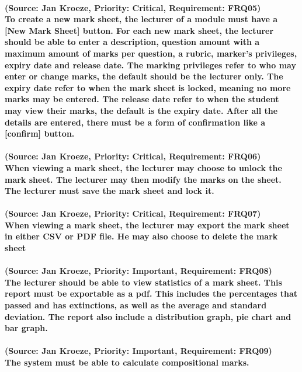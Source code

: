 \documentclass[12pt]{article}
\begin{document}
  \paragraph{(Source: Jan Kroeze, Priority: Critical, Requirement: FRQ05) \\
  To create a new mark sheet, the lecturer of a module must have a [New Mark Sheet] button. For each new mark sheet, the lecturer should be able to enter a description, question amount with a maximum amount of marks per question, a rubric, marker's privileges, expiry date and release date. The marking privileges refer to who may enter or change marks, the default should be the lecturer only. The expiry date refer to when the mark sheet is locked, meaning no more marks may be entered. The release date refer to when the student may view their marks, the default is the expiry date. After all the details are entered, there must be a form of confirmation like a [confirm] button.}
  \paragraph{(Source: Jan Kroeze, Priority: Critical, Requirement: FRQ06) \\
  When viewing a mark sheet, the lecturer may choose to unlock the mark sheet. The lecturer may then modify the marks on the sheet. The lecturer must save the mark sheet and lock it. }
  \paragraph{(Source: Jan Kroeze, Priority: Critical, Requirement: FRQ07) \\
  When viewing a mark sheet, the lecturer may export the mark sheet in either CSV or PDF file. He may also choose to delete the mark sheet}
  \paragraph{(Source: Jan Kroeze, Priority: Important, Requirement: FRQ08) \\
  The lecturer should be able to view statistics of a mark sheet.  This report must be exportable as a pdf. This includes the percentages that passed and has extinctions, as well as the average and standard deviation. The report also include a distribution graph, pie chart and bar graph.}
  \paragraph{(Source: Jan Kroeze, Priority: Important, Requirement: FRQ09) \\
  The system must be able to calculate compositional marks.}
\end{document}
